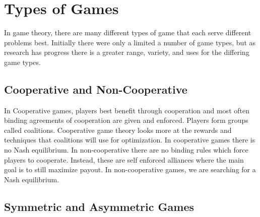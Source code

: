 \documentclass[12pt]{article}
\begin{document}
 	\section{Types of Games}
 	In game theory, there are many different types of game that each serve different problems best. Initially there were only a limited a number of game types, but as research has progress there is a greater range, variety, and uses for the differing game types.
 	\subsection{Cooperative and Non-Cooperative}
 		In Cooperative games, players best benefit through cooperation and most often binding agreements of cooperation are given and enforced. Players form groups called coalitions. Cooperative game theory looks more at the rewards and techniques that coalitions will use for optimization. In cooperative games there is no Nash equilibrium. In non-cooperative there are no binding rules which force players to cooperate. Instead, these are self enforced alliances where the main goal is to still maximize payout. In non-cooperative games, we are searching for a Nash equilibrium.
 	\subsection{Symmetric and Asymmetric Games}
 		
\end{document}
